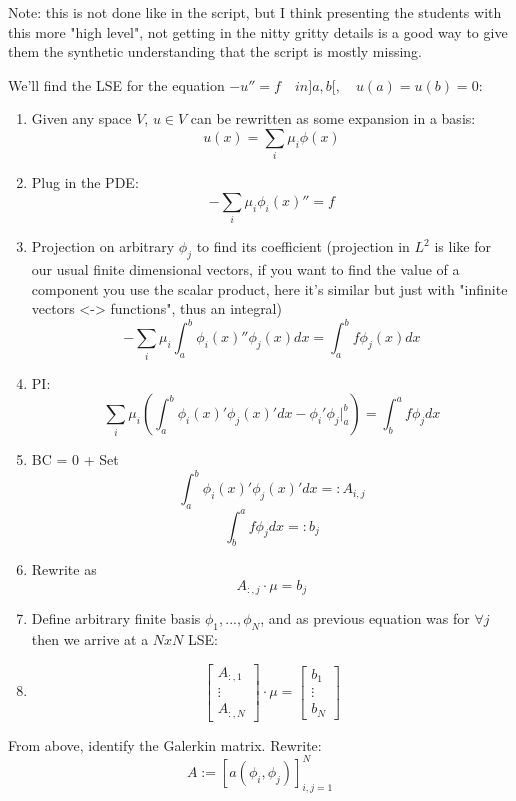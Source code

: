 
 Note: this is not done like in the script, but I think presenting the students with this more "high level", not getting in the nitty gritty details is a good way to give them the synthetic understanding that the script is mostly missing.

We'll find the LSE for the equation $-u'' = f \quad in ]a,b[, \quad u(a)=u(b)=0$:
\begin{enumerate}
    \item Given any space $V$, $u \in V$ can be rewritten as some expansion in a basis:
    $$ u(x) = \sum_i \mu_i \phi(x)$$
    \item Plug in the PDE:
    $$ - \sum_i \mu_i \phi_i(x)'' = f$$
    \item Projection on arbitrary $\phi_j$ to find its coefficient (projection in $L^2$ is like for our usual finite dimensional vectors, if you want to find the value of a component you use the scalar product, here it's similar but just with "infinite vectors <-> functions", thus an integral)
    $$ - \sum_i \mu_i \int_a^b \phi_i(x)''\phi_j(x) dx = \int_a^b f \phi_j(x) dx $$
    \item PI:
    $$ \sum_i \mu_i (\int_a^b \phi_i(x)'\phi_j(x)'dx - \phi_i'\phi_j |_a^b) = \int_b^a f\phi_j dx$$
    \item BC = 0 + Set $$\int_a^b \phi_i(x)'\phi_j(x)'dx =: A_{i,j}$$ $$\int_b^a f\phi_j dx =: b_j $$
    \item Rewrite as $$A_{:,j} \cdot \mu = b_j$$
    \item Define arbitrary finite basis ${\phi_1, ..., \phi_N}$, and as previous equation was for $\forall j$ then we arrive at a $NxN$ LSE:
    \item $$
    \begin{bmatrix}
    A_{:,1} \\
    \vdots \\
    A_{:, N}
    \end{bmatrix} \cdot \mu =
    \begin{bmatrix}
        b_1 \\
        \vdots \\
        b_N
    \end{bmatrix}
    $$
\end{enumerate}

From above, identify the Galerkin matrix. 
Rewrite:
$$A := [a(\phi_i, \phi_j)]_{i,j  = 1}^N$$

